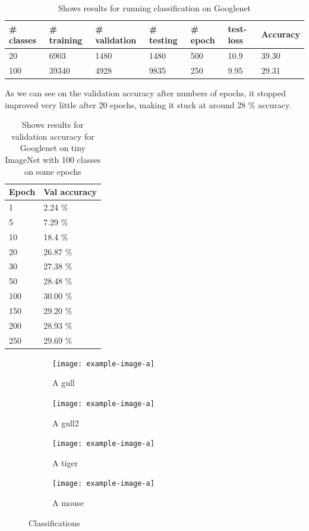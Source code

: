 \documentclass[twoside,11pt]{article}
\begin{document}
\begin{table}[!htbp]
  \centering
\caption{\label{tab:results} Shows results for running classification on Googlenet}
\begin{tabular}{| l l l l l l l|}
  \hline
  \# classes & \# training & \# validation & \# testing & \# epoch & test-loss & Accuracy\\ \hline
  20 & 6903 & 1480 & 1480 & 500 & 10.9 & 39.30 \\
  100 & 39340 & 4928 & 9835 & 250 & 9.95 & 29.31 \\
  \hline  
\end{tabular}
\end{table}

As we can see on the validation accuracy after numbers of epochs, it stopped improved very little after 20 epochs, making it stuck at around 28 \% accuracy. 

\begin{table}[!htbp]
  \centering
\caption{\label{tab:results} Shows results for validation accuracy for Googlenet on tiny ImageNet with 100 classes on some epochs}
\begin{tabular}{| l l |}
  \hline
  Epoch & Val accuracy \\ \hline
  1 & 2.24 \%\\
  5 & 7.29 \%\\
  10 & 18.4 \%\\
  20 & 26.87 \%\\
  30 & 27.38 \%\\
  50 & 28.48 \%\\
  100 & 30.00 \%\\
  150 & 29.20 \%\\
  200 & 28.93 \%\\
  250 & 29.69 \%\\
  \hline  
\end{tabular}
\end{table}


\begin{figure}[!htbp]
        \begin{subfigure}[b]{0.25\textwidth}
                \texttt{[image: example-image-a]}
                \caption{A gull}
                \label{fig:gull}
        \end{subfigure}%
        \begin{subfigure}[b]{0.25\textwidth}
                \texttt{[image: example-image-a]}
                \caption{A gull2}
                \label{fig:gull2}
        \end{subfigure}%
        \begin{subfigure}[b]{0.25\textwidth}
                \texttt{[image: example-image-a]}
                \caption{A tiger}
                \label{fig:tiger}
        \end{subfigure}%
        \begin{subfigure}[b]{0.25\textwidth}
                \texttt{[image: example-image-a]}
                \caption{A mouse}
                \label{fig:mouse}
        \end{subfigure}
        \caption{Classifications}\label{fig:animals}
\end{figure}
\end{document}
